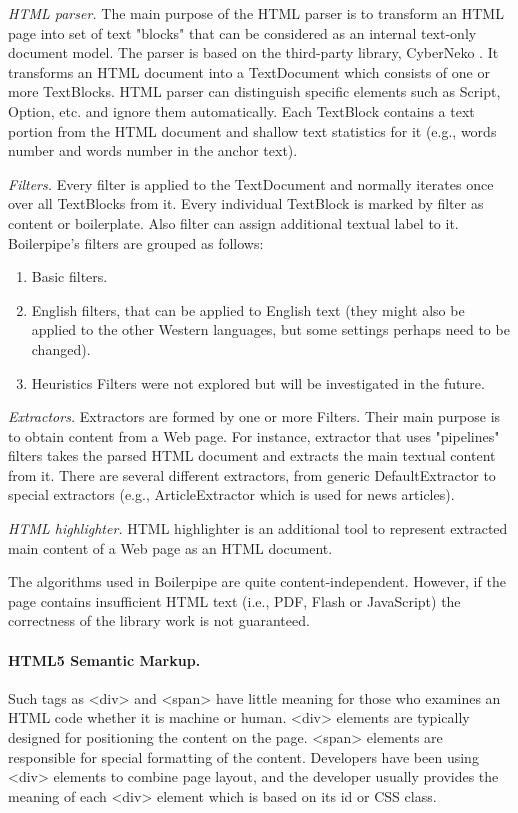 \textit{HTML parser.} The main purpose of the HTML parser is to transform an HTML page into set of text "blocks" that can be considered as an internal text-only document model. The parser is based on the third-party library, CyberNeko \cite{CyberNeko}. It transforms an HTML document into a TextDocument which consists of one or more TextBlocks. HTML parser can distinguish specific elements such as Script, Option, etc. and ignore them automatically. Each TextBlock contains a text portion from the HTML document and shallow text statistics for it (e.g., words number and words number in the anchor text).

\textit{Filters.} Every filter is applied to the TextDocument and normally iterates once over all TextBlocks from it. Every individual TextBlock is marked by filter as content or boilerplate. Also filter can assign additional textual label to it. Boilerpipe's filters are grouped as follows:

\begin{enumerate}
	\item Basic filters.
	\item English filters, that can be applied to English text (they might also be applied to the other Western languages, but some settings perhaps need to be changed).
	\item Heuristics Filters were not explored but will be investigated in the future.
\end{enumerate}

\textit{Extractors.} Extractors are formed by one or more Filters. Their main purpose is to obtain content from a Web page. For instance, extractor that uses "pipelines" filters takes the parsed HTML document and extracts the main textual content from it. There are several different extractors, from generic DefaultExtractor to special extractors (e.g., ArticleExtractor which is used for news articles).

\textit{HTML highlighter.} HTML highlighter is an additional tool to represent extracted main content of a Web page as an HTML document.

The algorithms used in Boilerpipe are quite content-independent. However, if the page contains insufficient HTML text (i.e., PDF, Flash or JavaScript) the correctness of the library work is not guaranteed.

\paragraph{HTML5 Semantic Markup.} Such tags as <div> and <span> have little meaning for those who examines an HTML code whether it is machine or human. <div> elements are typically designed for positioning the content on the page. <span> elements are responsible for special formatting of the content. Developers have been using <div> elements to combine page layout, and the developer usually provides the meaning of each <div> element which is based on its id or CSS class.

